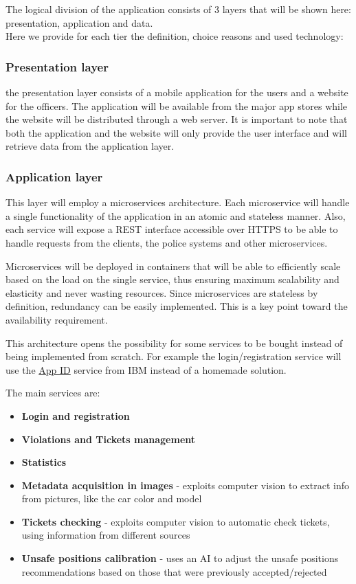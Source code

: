 The logical division of the application consists of 3 layers that will be shown here: presentation, application and data.
\\Here we provide for each tier the definition, choice reasons and used technology:
\subsubsection{Presentation layer}\label{presentationlayer}
the presentation layer consists of a mobile application for the users and a website for the officers.
The application will be available from the major app stores while the website will be distributed through a web server.
It is important to note that both the application and the website will only provide the user interface and will retrieve data from the application layer.

\subsubsection{Application layer}\label{applicationlayer}
This layer will employ a microservices architecture.
Each microservice will handle a single functionality of the application in an atomic and stateless manner.
Also, each service will expose a REST interface accessible over HTTPS to be able to handle requests from the clients, the police systems and other microservices.

Microservices will be deployed in containers that will be able to efficiently scale based on the load on the single service, thus ensuring maximum scalability and elasticity and never wasting resources.
Since microservices are stateless by definition, redundancy can be easily implemented. This is a key point toward the availability requirement.

This architecture opens the possibility for some services to be bought instead of being implemented from scratch. For example the login/registration service will use the \href{https://cloud.ibm.com/catalog/services/app-id#about}{App ID} service from IBM instead of a homemade solution.

The main services are:
\begin{itemize}
	\item \textbf{Login and registration}
	\item \textbf{Violations and Tickets management}
	\item \textbf{Statistics}
	\item \textbf{Metadata acquisition in images} - exploits computer vision to extract info from pictures, like the car color and model
	\item \textbf{Tickets checking} - exploits computer vision to automatic check tickets, using information from different sources
	\item \textbf{Unsafe positions calibration} - uses an AI to adjust the unsafe positions recommendations based on those that were previously accepted/rejected
\end{itemize}

